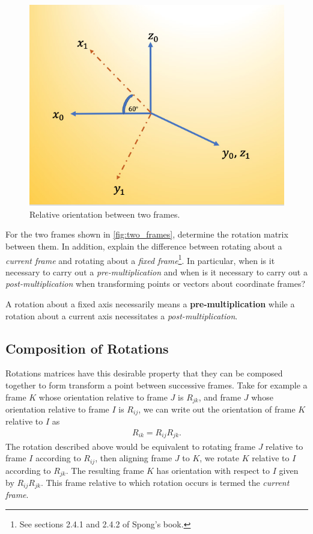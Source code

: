 \begin{figure}[tb!]
	\centering
	\includegraphics[width=.8\columnwidth]{figures/two_frames.jpg}
	\caption{Relative orientation between two frames.}
	\label{fig:two_frames}
\end{figure}


\noindent 
\begin{homework}
	For the two frames shown in \autoref{fig:two_frames}, determine the rotation matrix between them. In addition, explain the difference between rotating about a \textit{current frame} and rotating about a \textit{fixed frame}\footnote{See sections 2.4.1 and 2.4.2 of Spong's book.}. In particular, when is it necessary to carry out a \textit{pre-multiplication} and when is it necessary to carry out a \textit{post-multiplication} when transforming points or vectors about coordinate frames?
\end{homework}

\begin{tcolorbox}[title=Order of rotations]
	A rotation about a fixed axis necessarily means a \textbf{pre-multiplication} while a rotation about a current axis necessitates a \textit{post-multiplication}.
\end{tcolorbox}


\subsection{Composition of Rotations}
%
Rotations matrices have this desirable property that they can be composed together to form transform a point between successive frames. Take for example a frame $K$ whose orientation relative to frame $J$ is $R_{jk}$, and frame $J$ whose orientation relative to frame $I$ is $R_{ij}$, we can write out the orientation of frame $K$ relative to $I$ as 
%
\begin{align}
R_{ik} = R_{ij} R_{jk}.
\label{eq:current_frame_rotation}
\end{align}
%
The rotation described above would be equivalent to rotating frame $J$ relative to frame $I$ according to $R_{ij}$, then aligning frame $J$  to $K$, we rotate $K$ relative to $I$ according to $R_{jk}$. The resulting frame $K$ has orientation with respect to $I$ given by $R_{ij} R_{jk}$. This frame relative to which rotation occurs is termed the \textit{current frame}.

